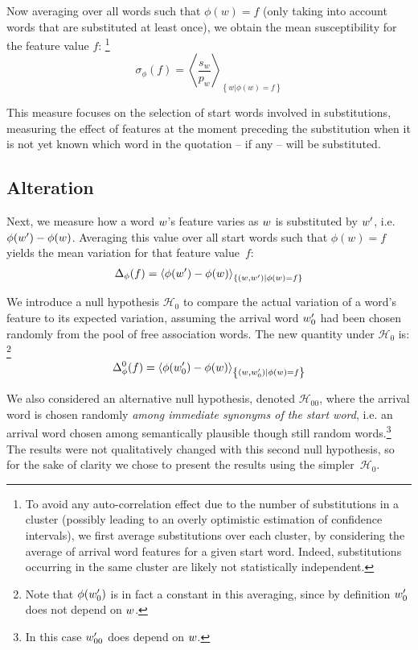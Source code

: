 Now averaging over all words such that $\phi(w) = f$ (only taking into account words that are substituted at least once), we obtain the mean susceptibility for the feature value $f$:
\footnote{To avoid any auto-correlation effect due to the number of substitutions in a cluster (possibly leading to an overly optimistic estimation of confidence intervals), we first average substitutions over each cluster, by considering the average of arrival word features for a given start word.
Indeed, substitutions occurring in the same cluster are likely not statistically independent.}
$$\sigma_{\phi}(f) = \left< \frac{s_w}{p_w} \right>_{\left\lbrace w | \phi(w) = f \right\rbrace}$$

This measure focuses on the selection of start words involved in substitutions, measuring the effect of features at the moment preceding the substitution when it is not yet known which word in the quotation -- if any -- will be substituted.

\subsection{Alteration}

Next, we measure how a word $w$'s feature varies as $w$ is substituted by $w'$, i.e. $\phi(w') - \phi(w)$.
Averaging this value over all start words such that $\phi(w) = f$ yields the mean variation for that feature value~$f$:
$$\Delta_{\phi}(f) = \left< \phi(w') - \phi(w) \right>_{\left\lbrace (w,w') | \phi(w) = f \right\rbrace}$$

We introduce a null hypothesis $\mathcal{H}_0$ to compare the actual variation of a word's feature to its expected variation, assuming the arrival word $w'_0$ had been chosen randomly from the pool of free association words.
The new quantity under $\mathcal{H}_0$ is:
\footnote{Note that $\phi(w'_0)$ is in fact a constant in this averaging, since by definition $w'_0$ does not depend on $w$.}
$$\Delta_{\phi}^0 (f) = \left< \phi({w'_0}) - \phi(w) \right>_{\left\lbrace (w,w'_0) | \phi(w) = f \right\rbrace}$$

We also considered an alternative null hypothesis, denoted $\mathcal{H}_{00}$, where the arrival word is chosen randomly \emph{among immediate synonyms of the start word}, i.e. an arrival word chosen among semantically plausible though still random words.\footnote{In this case $w'_{00}$ does depend on $w$.}
The results were not qualitatively changed with this second null hypothesis, so for the sake of clarity we chose to present the results using the simpler~$\mathcal{H}_0$.

